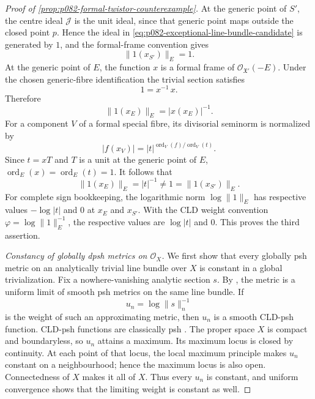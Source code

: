 \begin{proof}[Proof of
\cref{prop:p082-formal-twistor-counterexample}]
At the generic point of $S'$, the centre ideal $\mathcal J$ is the unit
ideal, since that generic point maps outside the closed point $p$.
Hence the ideal in
\eqref{eq:p082-exceptional-line-bundle-candidate} is generated by $1$,
and the formal-frame convention gives
\begin{equation}\label{eq:p082-metric-value-strict-transform-candidate}
                         \lVert1(x_{S'})\rVert_E=1.
\end{equation}
At the generic point of $E$, the function $x$ is a formal frame of
$\mathcal O_{\mathfrak X'}(-E)$.  Under the chosen generic-fibre
identification the trivial section satisfies
\[
                              1=x^{-1}\,x.
\]
Therefore
\begin{equation}\label{eq:p082-metric-value-exceptional-candidate}
                         \lVert1(x_E)\rVert_E=|x(x_E)|^{-1}.
\end{equation}
For a component $V$ of a formal special fibre, its divisorial seminorm is
normalized by
\[
 |f(x_V)|=|t|^{
       \operatorname{ord}_V(f)/\operatorname{ord}_V(t)}.
\]
Since $t=xT$ and $T$ is a unit at the generic point of $E$,
$\operatorname{ord}_E(x)=\operatorname{ord}_E(t)=1$.  It follows that
\begin{equation}\label{eq:p082-two-metric-values-candidate}
        \lVert1(x_E)\rVert_E=|t|^{-1}\neq1
              =\lVert1(x_{S'})\rVert_E.
\end{equation}
For complete sign bookkeeping, the logarithmic norm
$\log\lVert1\rVert_E$ has respective values
$-\log|t|$ and $0$ at $x_E$ and $x_{S'}$.  With the CLD weight
convention $\varphi=\log\lVert1\rVert_E^{-1}$, the respective values are
$\log|t|$ and $0$.  This proves the third assertion.

\emph{Constancy of globally dpsh metrics on $\mathcal O_X$.}
We first show that every globally psh metric on an analytically trivial
line bundle over $X$ is constant in a global trivialization.  Fix a
nowhere-vanishing analytic section $s$.  By
\cite[\S17.8.5]{CLD25}, the metric is a uniform limit of smooth psh metrics
on the same line bundle.  If
\[
                         u_n=\log\lVert s\rVert_n^{-1}
\]
is the weight of such an approximating metric, then $u_n$ is a smooth
CLD-psh function.  CLD-psh functions are classically psh
\cite[\S1.2]{GR25Classical}.  The proper space $X$ is compact and
boundaryless, so $u_n$ attains a maximum.  Its maximum locus is closed by
continuity.  At each point of that locus, the local maximum principle
\cite[Theorem~6.1]{GR25Classical} makes $u_n$ constant on a
neighbourhood; hence the maximum locus is also open.  Connectedness of
$X$ makes it all of $X$.  Thus every $u_n$ is constant, and uniform
convergence shows that the limiting weight is constant as well.


\end{proof}

